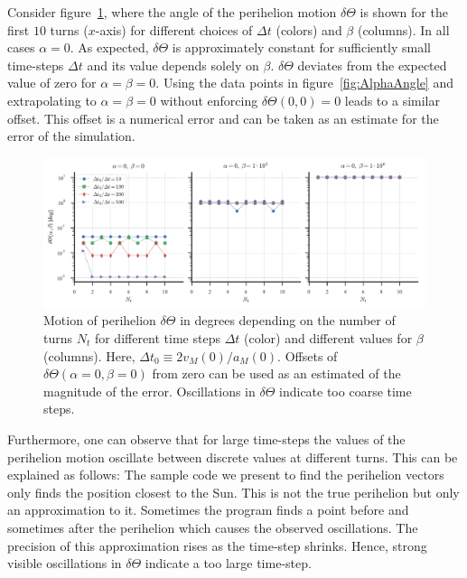 \documentclass[12pt,ngerman,american]{iopart}
\begin{document}
Consider figure~\ref{fcc3}, where the angle of the perihelion motion $\delta \Theta$ is shown for the first $10$ turns ($x$-axis) for different choices of $\Delta t$ (colors) and $\beta$ (columns). In all cases $\alpha=0$.
As expected, $\delta\Theta$ is approximately constant for sufficiently small time-steps $\Delta t$ and its value depends solely on $\beta$.
$\delta\Theta$ deviates from the expected value of zero for $\alpha = \beta = 0$.
Using the data points in figure~\ref{fig:AlphaAngle} and extrapolating to $\alpha=\beta=0$ without enforcing $\delta\Theta(0,0) = 0$ leads to a similar offset.
This offset is a numerical error and can be taken as an estimate for the error of the simulation.

\begin{figure}[htb]
	\centering
	\includegraphics[width=.99\textwidth]{figs/angular-variaton.pdf}
	\caption{\label{fcc3}Motion of perihelion $\delta\Theta$ in degrees depending on the number of turns $N_t$ for different time steps $\Delta t$ (color) and different values for $\beta$ (columns).
	Here, $\Delta t_0 \equiv 2 v_M(0)/a_M(0)$.
	Offsets of $\delta \Theta(\alpha=0, \beta=0)$ from zero can be used as an estimated of the magnitude of the error. Oscillations in $\delta \Theta$ indicate too coarse time steps.
}
\end{figure}

Furthermore, one can observe that for large time-steps the values of the perihelion motion oscillate between discrete values at different turns.
This can be explained as follows: The sample code we present to find the perihelion vectors only finds the position closest to the Sun.
This is not the true perihelion but only an approximation to it. Sometimes the program finds a point before and sometimes after the perihelion which causes the observed oscillations.
The precision of this approximation rises as the time-step shrinks.
Hence, strong visible oscillations in $\delta\Theta$ indicate a too large time-step.
\end{document}
